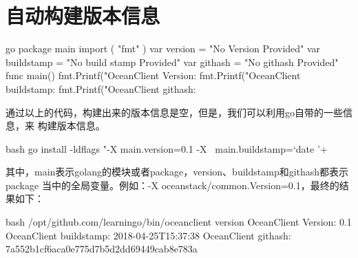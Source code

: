 \section{自动构建版本信息}
\begin{code-block}{go}
package main
import (
    "fmt"
)
var version = "No Version Provided"
var buildstamp = "No build stamp Provided"
var githash = "No githash Provided"
func main() {
    fmt.Printf("OceanClient Version: %
    fmt.Printf("OceanClient buildstamp: %
    fmt.Printf("OceanClient githash: %
}
\end{code-block}

通过以上的代码，构建出来的版本信息是空，但是，我们可以利用go自带的一些信息，来
构建版本信息。
\begin{code-block}{bash}
go install -ldflags "-X main.version=0.1 -X \
    main.buildstamp=`date '+%
\end{code-block}
其中，main表示golang的模块或者package，version、buildstamp和githash都表示package
当中的全局变量。例如：-X oceanstack/common.Version=0.1，最终的结果如下：
\begin{code-block}{bash}
/opt/github.com/learningo/bin/oceanclient version
OceanClient Version: 0.1
OceanClient buildstamp: 2018-04-25T15:37:38
OceanClient githash: 7a552b1cf6aca0e775d7b5d2dd69449cab8e783a
\end{code-block}

